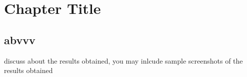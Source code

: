\chapter{Chapter Title}
\label{ch:SC}
\section{abvvv}

discuss about the results obtained, you may inlcude sample screenshots of the results obtained